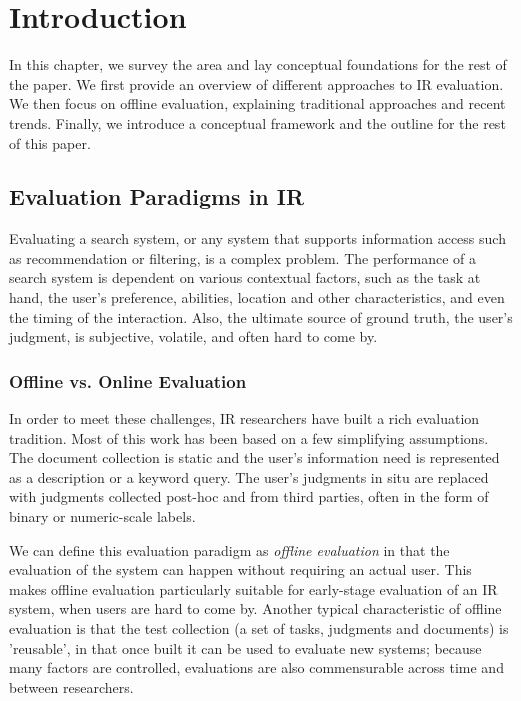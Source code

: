 
\chapter{Introduction}
\label{c-intro}

In this chapter, we survey the area and lay conceptual foundations for the rest of the paper. We first provide an overview of different approaches to IR evaluation. We then focus on offline evaluation, explaining traditional approaches and recent trends. Finally, we introduce a conceptual framework and the outline for the rest of this paper.

\section{Evaluation Paradigms in IR}
\label{sec:evaluation-paradigms}

Evaluating a search system, or any system that supports information access such as recommendation or filtering, is a complex problem. The performance of a search system is dependent on various contextual factors, such as the task at hand, the user's preference, abilities, location and other characteristics, and even the timing of the interaction. Also, the ultimate source of ground truth, the user's judgment, is subjective, volatile, and often hard to come by.

\subsection{Offline vs. Online Evaluation}

In order to meet these challenges, IR researchers have built a rich evaluation tradition. Most of this work has been based on a few simplifying assumptions. The document collection is static and the user's information need is represented as a description or a keyword query. The user's judgments in situ are replaced with judgments collected post-hoc and from third parties, often in the form of binary or numeric-scale labels.

We can define this evaluation paradigm as \textit{offline evaluation} \citep{INR-009} in that the evaluation of the system can happen without requiring an actual user. This makes offline evaluation particularly suitable for early-stage evaluation of an IR system, when users are hard to come by. Another typical characteristic of offline evaluation is that the test collection (a set of tasks, judgments and documents) is 'reusable', in that once built it can be used to evaluate new systems; because many factors are controlled, evaluations are also commensurable across time and between researchers.

